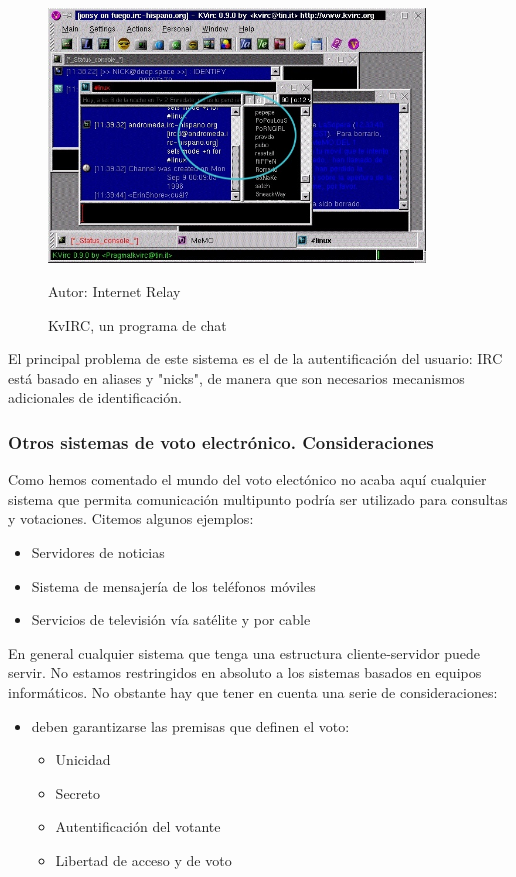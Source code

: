 \begin{figure}[h!]
\centering
\includegraphics[width=10cm]{Figuras/kvirc.jpg}
\caption{KvIRC, un programa de chat}
Autor:  Internet Relay
\end{figure}

El principal problema de este sistema es el de la autentificación del usuario: IRC está basado en aliases y "nicks", de manera que son necesarios mecanismos adicionales de identificación.

\subsubsection{Otros sistemas de voto electrónico. Consideraciones}
Como hemos comentado el mundo del voto electónico no acaba aquí cualquier sistema que permita comunicación multipunto podría ser utilizado para consultas y votaciones. Citemos algunos ejemplos:

\begin{itemize}
\item Servidores de noticias
\item Sistema de mensajería de los teléfonos móviles
\item Servicios de televisión vía satélite y por cable
\end{itemize}

En general cualquier sistema que tenga una estructura cliente-servidor puede servir. No estamos restringidos en absoluto a los sistemas basados en equipos informáticos. No obstante hay que tener en cuenta una serie de consideraciones:

\begin{itemize}
\item deben garantizarse las premisas que definen el voto:
	\begin{itemize}
	\item Unicidad
	\item Secreto
	\item Autentificación del votante
	\item Libertad de acceso y de voto
	\end{itemize}
\end{itemize}


